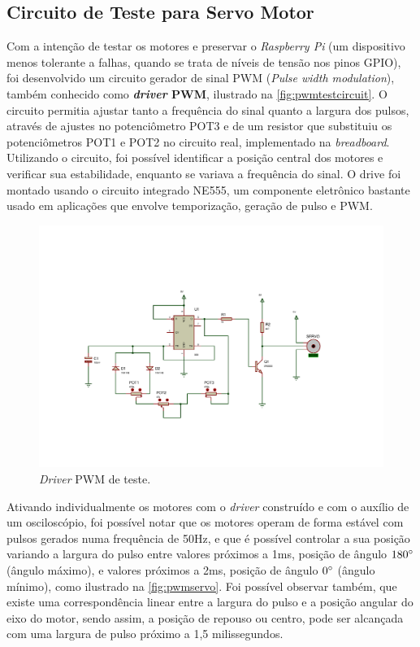 \subsection{Circuito de Teste para Servo Motor}
\label{subsec:servotester}

Com a intenção de testar os motores e preservar o \textit{Raspberry Pi} (um dispositivo menos tolerante a falhas, quando se trata de níveis de tensão nos pinos GPIO), foi desenvolvido um circuito gerador de sinal PWM (\textit{Pulse width modulation}), também conhecido como \textbf{\textit{driver} PWM}, ilustrado na \autoref{fig:pwmtestcircuit}. O circuito permitia ajustar tanto a frequência do sinal quanto a largura dos pulsos, através de ajustes no potenciômetro POT3 e de um resistor que substituiu os potenciômetros POT1 e POT2 no circuito real, implementado na \textit{breadboard}. Utilizando o circuito, foi possível identificar a posição central dos motores e verificar sua estabilidade, enquanto se variava a frequência do sinal. O drive foi montado usando o circuito integrado NE555, um componente eletrônico bastante usado em aplicações que envolve temporização, geração de pulso e PWM. \par

\begin{figure}[H]
	\centering
	\includegraphics[trim={2.5cm 3cm 4cm 5cm},clip,width=1\textwidth]{figuras/pwm2.pdf}
	\caption{\textit{Driver} PWM de teste.}
	\label{fig:pwmtestcircuit}
\end{figure}

Ativando individualmente os motores com o \textit{driver} construído e com o auxílio de um osciloscópio, foi possível notar que os motores operam de forma estável com pulsos gerados numa frequência de 50Hz, e que é possível controlar a sua posição variando a largura do pulso entre valores próximos a 1ms, posição de ângulo $180\degree$ (ângulo máximo), e valores próximos a 2ms, posição de ângulo $0\degree$ (ângulo mínimo), como ilustrado na \autoref{fig:pwmservo}. Foi possível observar também, que existe uma correspondência linear entre a largura do pulso e a posição angular do eixo do motor, sendo assim, a posição de repouso ou centro, pode ser alcançada com uma largura de pulso próximo a 1,5 milissegundos. 


